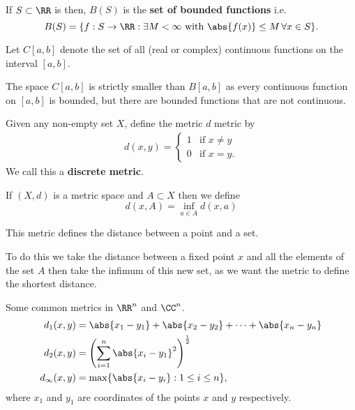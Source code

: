 \documentclass[12pt, a4paper]{article}
\begin{document}
\begin{definition}
    If \(S \subset \RR\) is then, \(B(S)\)  is the \textbf{set of bounded functions} i.e. 
    \[B(S) = \{f : S \to \RR : \exists M < \infty \text{ with } \abs{f(x)} \leq M \, \forall x \in S\}.\]
\end{definition}

\begin{definition}
    Let \(C[a,b]\) denote the set of all (real or complex) continuous functions on the interval \([a,b]\).
\end{definition}

\begin{mdnote}
    The space \(C[a,b]\) is strictly smaller than \(B[a,b]\) as every continuous function on \([a,b]\) is bounded, but there are bounded functions that are not continuous.
\end{mdnote}

\begin{definition}
    Given any non-empty set \(X\), define the metric \(d\) metric by 
    \[\begin{aligned}
        d(x,y) = \begin{cases}
            1 &\text{if } x \neq y \\
            0 &\text{if } x =y.
        \end{cases}
    \end{aligned}\]
    We call this a \textbf{discrete metric}.
\end{definition}

\begin{definition}
    If \((X,d)\) is a metric space and \(A \subset X\) then we define 
    \[d(x,A) = \inf_{a \in A} d(x,a)\]
\end{definition}

\begin{mdremark}
    This metric defines the distance between a point and a set.
\end{mdremark}

\begin{mdnote}
    To do this we take the distance between a fixed point \(x\) and all the elements of the set \(A\) then take the infimum of this new set, as we want the metric to define the shortest distance.
\end{mdnote}

\begin{mdexample}
    Some common metrics in \(\RR^n\) and \(\CC^n\).
    \[\begin{aligned}
        d_1(x,y) &= \abs{x_1-y_1}+\abs{x_2-y_2}+ \cdots + \abs{x_n -y_n} \\
        d_2(x,y) &= \left( \sum_{i=1}^{n} \abs{x_i-y_1}^2 \right) ^{\frac{1}{2}} \\
        d_{\infty}(x,y) &= \max\{\abs{x_i - y_i} : 1 \leq i \leq n\},
    \end{aligned}\]
    where \(x_1\) and \(y_1\) are coordinates of the points \(x\) and \(y\) respectively.
\end{mdexample}
\end{document}

